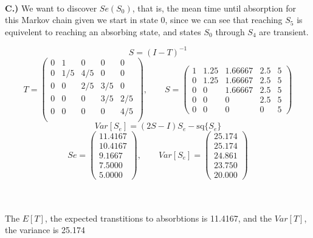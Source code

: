 \documentclass{article}
\begin{document}
\\\textbf{C.)} We want to discover $Se(S_0)$, that is, the mean time until
absorption for this Markov chain given we start in state 0, since we can see
that reaching $S_5$ is equivelent to reaching an absorbing state, and states
$S_0$ through $S_4$ are transient. 

\[ S = (I - T)^{-1} \]
\[T = \left(\begin{array}{rrrrr}
0&  1&  0&  0&  0\\
0&1/5&4/5&  0&  0\\
0&  0&2/5&3/5&  0\\
0&  0&  0&3/5&2/5\\
0&  0&  0&  0&4/5\\
\end{array}\right), \quad \quad S = \left(\begin{array}{rrrrr}
  1 & 1.25 &   1.66667 &  2.5  & 5 \\
  0 & 1.25 &  1.66667 &  2.5 &  5 \\
  0 & 0 &  1.66667  & 2.5 &  5 \\
  0 & 0 & 0 &  2.5 &  5\\
  0 & 0 & 0 & 0 &  5
\end{array}\right)\]
\[Var[S_e] = (2S - I)S_e - \mbox{sq}\{S_e\}\]
\[ Se = \left(\begin{array}{r}
   11.4167\\
   10.4167\\
    9.1667\\
    7.5000\\
    5.0000
\end{array}\right), \quad \quad Var[S_e] = 
\left(\begin{array}{r}
 25.174 \\
 25.174 \\
 24.861 \\
 23.750 \\
 20.000
\end{array}\right)\]

\\
\\The $E[T]$, the expected transtitions to absorbtions is 11.4167, and
the $Var[T]$, the variance is 25.174
\end{document}
